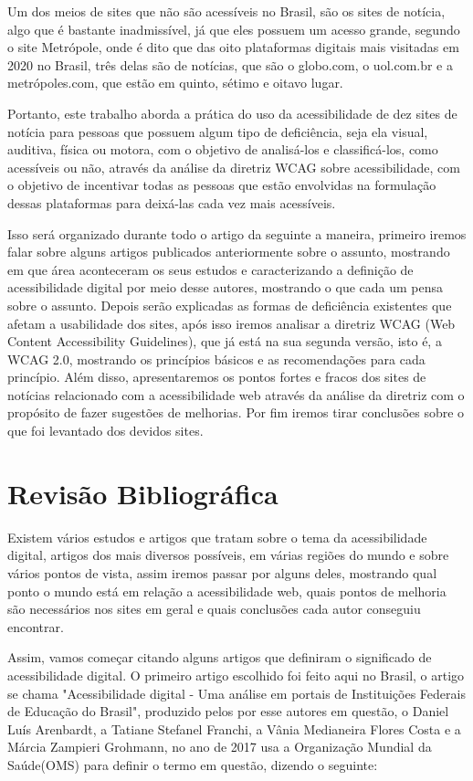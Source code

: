 \documentclass[a4paper]{article}
\begin{document}
\begin{titlepage}
Um dos meios de sites que não são acessíveis no Brasil, são os sites de notícia, algo que é bastante inadmissível, já que eles possuem um acesso grande, segundo o site Metrópole, onde é dito que das oito plataformas digitais mais visitadas em 2020 no Brasil, três delas são de notícias, que são o globo.com, o uol.com.br e a metrópoles.com, que estão em quinto, sétimo e oitavo lugar.

Portanto, este trabalho aborda a prática do uso da acessibilidade de dez sites de notícia para pessoas que possuem algum tipo de deficiência, seja ela visual, auditiva, física ou motora, com o objetivo de analisá-los e classificá-los, como acessíveis ou não, através da análise da diretriz WCAG sobre acessibilidade, com o objetivo de incentivar todas as pessoas que estão envolvidas na formulação dessas plataformas para deixá-las cada vez mais acessíveis.

Isso será organizado durante todo o artigo da seguinte a maneira, primeiro iremos falar sobre alguns artigos publicados anteriormente sobre o assunto, mostrando em que área aconteceram os seus estudos e caracterizando a definição de acessibilidade digital por meio desse autores, mostrando o que cada um pensa sobre o assunto. Depois serão explicadas as formas de deficiência existentes que afetam a usabilidade dos sites, após isso iremos analisar a diretriz WCAG (Web Content Accessibility Guidelines), que já está na sua segunda versão, isto é, a WCAG 2.0, mostrando os princípios básicos e as recomendações para cada princípio. Além disso, apresentaremos os pontos fortes e fracos dos sites de notícias relacionado com a acessibilidade web através da análise da diretriz com o propósito de fazer sugestões de melhorias. Por fim iremos tirar conclusões sobre o que foi levantado dos devidos sites. 

\section{Revisão Bibliográfica}
Existem vários estudos e artigos que tratam sobre o tema da acessibilidade digital, artigos dos mais diversos possíveis, em várias regiões do mundo e sobre vários pontos de vista, assim iremos passar por alguns deles, mostrando qual ponto o mundo está em relação a acessibilidade web, quais pontos de melhoria são necessários nos sites em geral e quais conclusões cada autor conseguiu encontrar. 

Assim, vamos começar citando alguns artigos que definiram o significado de acessibilidade digital. O primeiro artigo escolhido foi feito aqui no Brasil, o artigo se chama "Acessibilidade digital - Uma análise em portais de Instituições Federais de Educação do Brasil", produzido pelos por esse autores em questão, o Daniel Luís Arenbardt, a Tatiane Stefanel Franchi, a Vânia Medianeira Flores Costa e a Márcia Zampieri Grohmann, no ano de 2017 usa a Organização Mundial da Saúde(OMS) para definir o termo em questão, dizendo o seguinte:\\[0.5cm]


\end{titlepage}
\end{document}
